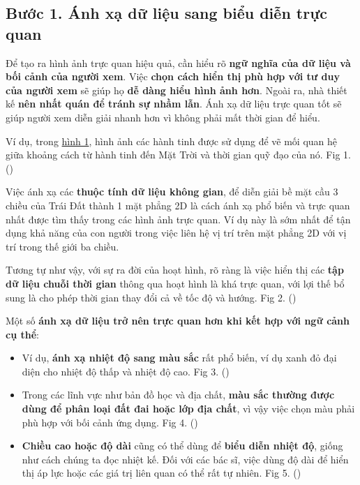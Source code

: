 \subsection{Bước 1. Ánh xạ dữ liệu sang biểu diễn trực
quan}\label{bux1b0ux1edbc-1.-uxe1nh-xux1ea1-dux1eef-liux1ec7u-sang-biux1ec3u-diux1ec5n-trux1ef1c-quan}

Để tạo ra hình ảnh trực quan hiệu quả, cần hiểu rõ \textbf{ngữ nghĩa của
dữ liệu và bối cảnh của người xem}. Việc \textbf{chọn cách hiển thị phù
hợp với tư duy của người xem} sẽ giúp họ \textbf{dễ dàng hiểu hình ảnh
hơn}. Ngoài ra, nhà thiết kế \textbf{nên nhất quán để tránh sự nhầm
lẫn}. Ánh xạ dữ liệu trực quan tốt sẽ giúp người xem diễn giải nhanh hơn
vì không phải mất thời gian để hiểu.

Ví dụ, trong \href{...}{hình 1}, hình ảnh các hành tinh được sử dụng để
vẽ mối quan hệ giữa khoảng cách từ hành tinh đến Mặt Trời và thời gian
quỹ đạo của nó. Fig 1. ()

Việc ánh xạ các \textbf{thuộc tính dữ liệu không gian}, để diễn giải bề
mặt cầu 3 chiều của Trái Đất thành 1 mặt phẳng 2D là cách ánh xạ phổ
biến và trực quan nhất được tìm thấy trong các hình ảnh trực quan. Ví dụ
này là sớm nhất để tận dụng khả năng của con người trong việc liên hệ vị
trí trên mặt phẳng 2D với vị trí trong thế giới ba chiều.

Tương tự như vậy, với sự ra đời của hoạt hình, rõ ràng là việc hiển thị
các \textbf{tập dữ liệu chuỗi thời gian} thông qua hoạt hình là khá trực
quan, với lợi thế bổ sung là cho phép thời gian thay đổi cả về tốc độ và
hướng. Fig 2. ()

Một số \textbf{ánh xạ dữ liệu trở nên trực quan hơn khi kết hợp với ngữ
cảnh cụ thể}:

\begin{itemize}
\item
  Ví dụ, \textbf{ánh xạ nhiệt độ sang màu sắc} rất phổ biến, ví dụ xanh
  đỏ đại diện cho nhiệt độ thấp và nhiệt độ cao. Fig 3. ()
\item
  Trong các lĩnh vực như bản đồ học và địa chất, \textbf{màu sắc thường
  được dùng để phân loại đất đai hoặc lớp địa chất}, vì vậy việc chọn
  màu phải phù hợp với bối cảnh ứng dụng. Fig 4. ()
\item
  \textbf{Chiều cao hoặc độ dài} cũng có thể dùng để \textbf{biểu diễn
  nhiệt độ}, giống như cách chúng ta đọc nhiệt kế. Đối với các bác sĩ,
  việc dùng độ dài để hiển thị áp lực hoặc các giá trị liên quan có thể
  rất tự nhiên. Fig 5. ()
\end{itemize}

